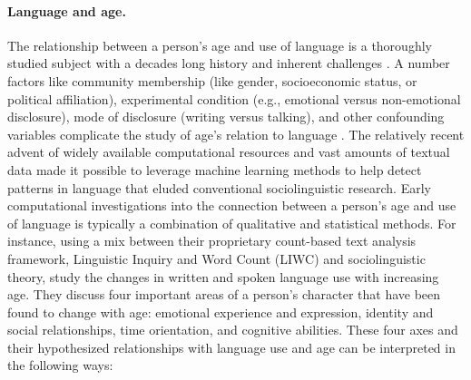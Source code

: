 
\paragraph{Language and age.}

The relationship between a person's age and use of language is a thoroughly studied subject with a decades long history and inherent challenges \citep{pennebaker2003words, nguyen2014gender}. A number factors like community membership (like gender, socioeconomic status, or political affiliation), experimental condition (e.g., emotional versus non-emotional disclosure), mode of disclosure (writing versus talking), and other confounding variables complicate the study of age's relation to language \citep{nguyen-etal-2011-author}. The relatively recent advent of widely available computational resources and vast amounts of textual data made it possible to leverage machine learning methods to help detect patterns in language that eluded conventional sociolinguistic research. Early computational investigations into the connection between a person's age and use of language is typically a combination of qualitative and statistical methods. For instance, using a mix between their proprietary count-based text analysis framework, Linguistic Inquiry and Word Count (LIWC) and sociolinguistic theory, \cite{pennebaker2003words} study the changes in written and spoken language use with increasing age. They discuss four important areas of a person's character that have been found to change with age: emotional experience and expression, identity and social relationships, time orientation, and cognitive abilities. These four axes and their hypothesized relationships with language use and age can be interpreted in the following ways:
